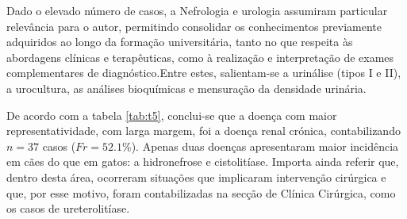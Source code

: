 Dado o elevado número de casos, a Nefrologia e urologia assumiram particular relevância para o autor, permitindo consolidar os conhecimentos previamente adquiridos ao longo da formação universitária, tanto no que respeita às abordagens clínicas e terapêuticas, como à realização e interpretação de exames complementares de diagnóstico.Entre estes, salientam-se a urinálise (tipos I e II), a urocultura, as análises bioquímicas e mensuração da densidade urinária.

De acordo com a tabela \ref{tab:t5}, conclui-se que a doença com maior representatividade, com larga margem, foi a doença renal crónica, contabilizando $n=37$ casos ($Fr=52.1\%$). Apenas duas doenças apresentaram maior incidência em cães do que em gatos: a hidronefrose e cistolitíase. Importa ainda referir que, dentro desta área, ocorreram situações que implicaram intervenção cirúrgica e que, por esse motivo, foram contabilizadas na secção de Clínica Cirúrgica, como os casos de ureterolitíase.

